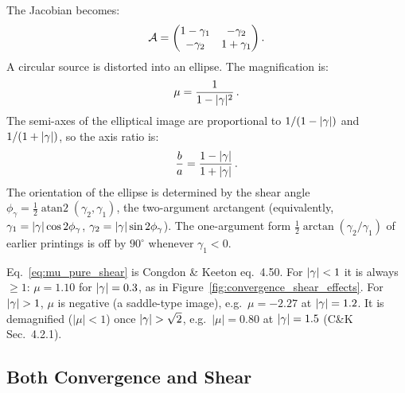 The Jacobian becomes:
\begin{equation}
    \mathcal{A} = \begin{pmatrix}
    1 - \gamma_1 & -\gamma_2 \\
    -\gamma_2 & 1 + \gamma_1
    \end{pmatrix} .
\end{equation}
A circular source is distorted into an ellipse.  The
magnification is:
\begin{equation}
    \mu = \frac{1}{1 - |\gamma|^2} \,.
    \label{eq:mu_pure_shear}
\end{equation}
The semi-axes of the elliptical image are proportional to
$1/(1 - |\gamma|)$ and $1/(1 + |\gamma|)$, so the axis ratio is:
\begin{equation}
    \frac{b}{a} = \frac{1 - |\gamma|}{1 + |\gamma|} \,.
    \label{eq:axis_ratio_pure_shear}
\end{equation}
The orientation of the ellipse is determined by the shear angle
$\phi_\gamma = \frac{1}{2}\operatorname{atan2}(\gamma_2, \gamma_1)$, the
two-argument arctangent (equivalently, $\gamma_1 = |\gamma|\cos2\phi_\gamma$,
$\gamma_2 = |\gamma|\sin2\phi_\gamma$).  The one-argument form
$\frac{1}{2}\arctan(\gamma_2/\gamma_1)$ of earlier printings is off by
$90^\circ$ whenever $\gamma_1 < 0$.
\begin{annotation}[Pure shear beyond $|\gammaL| = 1$]
Eq.~\eqref{eq:mu_pure_shear} is Congdon \& Keeton eq.~4.50. For $|\gamma| < 1$
it is always $\ge 1$: $\mu = 1.10$ for $|\gamma| = 0.3$, as in
Figure~\ref{fig:convergence_shear_effects}. For $|\gamma| > 1$, $\mu$ is
negative (a saddle-type image), e.g.\ $\mu = -2.27$ at $|\gamma| = 1.2$. It is
demagnified ($|\mu| < 1$) once $|\gamma| > \sqrt2$, e.g.\ $|\mu| = 0.80$ at
$|\gamma| = 1.5$ (C\&K Sec.~4.2.1).
\end{annotation}

\subsection{Both Convergence and Shear}


